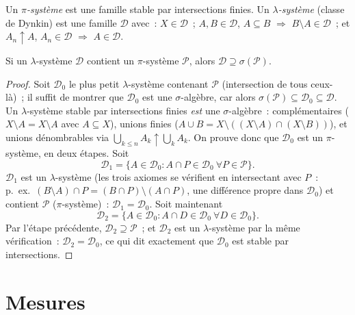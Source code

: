 \begin{definition}\label{def:b3:measure:dynkin}
Un \emph{$\pi$-système} est une
famille stable par intersections finies. Un
\emph{$\lambda$-système}
(classe de Dynkin) est une famille $\mathcal D$ avec~: $X \in
\mathcal D$~; $A, B \in \mathcal D$, $A \subseteq B$
$\Rightarrow$ $B \setminus A \in \mathcal D$~; et $A_n
\uparrow A$, $A_n \in \mathcal D$ $\Rightarrow$ $A \in
\mathcal D$.
\end{definition}

\begin{theorem}
\label{thm:b3:measure:dynkin}
Si un $\lambda$-système $\mathcal D$ contient un
$\pi$-système $\mathcal P$, alors $\mathcal D \supseteq
\sigma(\mathcal P)$.
\end{theorem}

\begin{proof}
Soit $\mathcal D_0$ le plus petit $\lambda$-système contenant
$\mathcal P$ (intersection de tous ceux-là)~; il suffit de
montrer que $\mathcal D_0$ est une $\sigma$-algèbre, car alors
$\sigma(\mathcal P) \subseteq \mathcal D_0 \subseteq \mathcal
D$. Un $\lambda$-système stable par intersections finies
\emph{est} une $\sigma$-algèbre~: complémentaires ($X
\setminus A = X \setminus A$ avec $A \subseteq X$), unions
finies ($A \cup B = X \setminus ((X\setminus
A)\cap(X\setminus B))$), et unions dénombrables via
$\bigcup_{k \leq n}A_k \uparrow \bigcup_kA_k$. On prouve donc
que $\mathcal D_0$ est un $\pi$-système, en deux étapes. Soit
\[
\mathcal D_1 = \{A \in \mathcal D_0 : A \cap P \in \mathcal
D_0 \ \forall P \in \mathcal P\}.
\]
$\mathcal D_1$ est un $\lambda$-système (les trois axiomes se
vérifient en intersectant avec $P$~: p.~ex.\ $(B\setminus
A)\cap P = (B \cap P)\setminus(A \cap P)$, une différence
propre dans $\mathcal D_0$) et contient $\mathcal P$
($\pi$-système)~: $\mathcal D_1 = \mathcal D_0$. Soit
maintenant
\[
\mathcal D_2 = \{A \in \mathcal D_0 : A \cap D \in \mathcal
D_0\ \forall D \in \mathcal D_0\}.
\]
Par l'étape précédente, $\mathcal D_2 \supseteq \mathcal P$~;
et $\mathcal D_2$ est un $\lambda$-système par la même
vérification~: $\mathcal D_2 = \mathcal D_0$, ce qui dit
exactement que $\mathcal D_0$ est stable par intersections.
\end{proof}

\section{Mesures}

